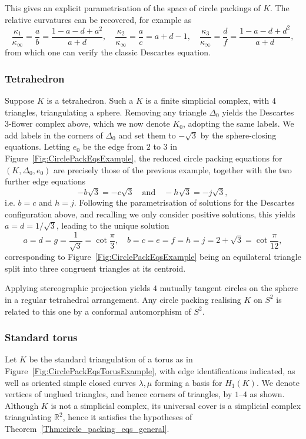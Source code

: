 \documentclass[12pt]{amsart}
\numberwithin{equation}{section}
\theoremstyle{named}
\newcommand{\reffig}[1]{Figure~\ref{Fig:#1}}
\newcommand{\refthm}[1]{Theorem~\ref{Thm:#1}}
\newcommand{\R}{\mathbb{R}}
\begin{document}
This gives an explicit parametrisation of the space of circle packings of $K$. The relative curvatures can be recovered, for example as
\[
\frac{\kappa_1}{\kappa_\infty} = \frac{a}{b} = \frac{1-a-d+a^2}{a+d}, \quad
\frac{\kappa_2}{\kappa_\infty} = \frac{a}{c} = a+d-1, \quad
\frac{\kappa_3}{\kappa_\infty} = \frac{d}{f} = \frac{1-a-d+d^2}{a+d},
\]
from which one can verify the classic Descartes equation.


\subsubsection{Tetrahedron}

Suppose $K$ is a tetrahedron. Such a $K$ is a finite simplicial complex, with $4$ triangles, triangulating a sphere. Removing any triangle $\Delta_0$ yields the Descartes 3-flower complex above, which we now denote $K_0$, adopting the same labels. We add labels in the corners of $\Delta_0$ and set them to $-\sqrt{3}$ by the sphere-closing equations. Letting $e_0$ be the edge from $2$ to $3$ in \reffig{CirclePackEqsExample}, the reduced circle packing equations for $(K, \Delta_0, e_0)$ are precisely those of the previous example, together with the two further edge equations
\[
-b \sqrt{3} = - c \sqrt{3}
\quad \text{and} \quad
-h \sqrt{3} = - j \sqrt{3},
\]
i.e. $b=c$ and $h=j$. Following the parametrisation of solutions for the Descartes configuration above, and recalling we only consider positive solutions, this yields $a=d = 1/\sqrt{3}$, leading to the unique solution 
\[
a=d=g=\frac{1}{\sqrt{3}} = \cot \frac{\pi}{3}, \quad
b=c=e=f=h=j = 2+\sqrt{3} = \cot \frac{\pi}{12},
\]
corresponding to \reffig{CirclePackEqsExample} being an equilateral triangle split into three congruent triangles at its centroid.

Applying stereographic projection yields $4$ mutually tangent circles on the sphere in a regular tetrahedral arrangement. Any circle packing realising $K$ on $S^2$ is related to this one by a conformal automorphism of $S^2$.

\subsubsection{Standard torus}
\label{Sec:standard_torus}
Let $K$ be the standard triangulation of a torus as in \reffig{CirclePackEqsTorusExample}, with edge identifications indicated, as well as oriented simple closed curves $\lambda, \mu$ forming a basis for $H_1 (K)$. We denote vertices of unglued triangles, and hence corners of triangles, by $1$--$4$ as shown. Although $K$ is not a simplicial complex, its universal cover is a simplicial complex triangulating $\R^2$, hence it satisfies the hypotheses of \refthm{circle_packing_eqs_general}.
\end{document}
